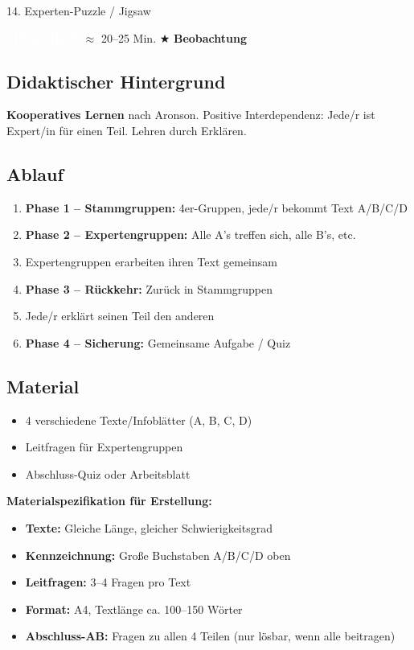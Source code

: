 \documentclass[11pt, a4paper]{article}
\newcommand{\tagSprechen}{\colorbox{sprechen}{\textcolor{white}{\footnotesize\textbf{SPRECHEN}}}}
\newcommand{\zeit}[1]{\textcolor{grau}{\footnotesize $\approx$ #1 Min.}}
\newcommand{\beobachtung}{\textcolor{erfolg}{\footnotesize $\bigstar$ \textbf{Beobachtung}}}
\begin{document}
\begin{methode}{14. Experten-Puzzle / Jigsaw}

\tagSprechen{} \zeit{20--25} \hfill \beobachtung

\subsection*{Didaktischer Hintergrund}
\textbf{Kooperatives Lernen} nach Aronson. Positive Interdependenz: Jede/r ist Expert/in für einen Teil. Lehren durch Erklären.

\subsection*{Ablauf}
\begin{enumerate}[leftmargin=*]
    \item \textbf{Phase 1 -- Stammgruppen:} 4er-Gruppen, jede/r bekommt Text A/B/C/D
    \item \textbf{Phase 2 -- Expertengruppen:} Alle A's treffen sich, alle B's, etc.
    \item Expertengruppen erarbeiten ihren Text gemeinsam
    \item \textbf{Phase 3 -- Rückkehr:} Zurück in Stammgruppen
    \item Jede/r erklärt seinen Teil den anderen
    \item \textbf{Phase 4 -- Sicherung:} Gemeinsame Aufgabe / Quiz
\end{enumerate}

\subsection*{Material}
\begin{materialbox}
\begin{itemize}[label=$\square$, leftmargin=*]
    \item 4 verschiedene Texte/Infoblätter (A, B, C, D)
    \item Leitfragen für Expertengruppen
    \item Abschluss-Quiz oder Arbeitsblatt
\end{itemize}

\textbf{Materialspezifikation für Erstellung:}
\begin{itemize}[leftmargin=*]
    \item \textbf{Texte:} Gleiche Länge, gleicher Schwierigkeitsgrad
    \item \textbf{Kennzeichnung:} Große Buchstaben A/B/C/D oben
    \item \textbf{Leitfragen:} 3--4 Fragen pro Text
    \item \textbf{Format:} A4, Textlänge ca. 100--150 Wörter
    \item \textbf{Abschluss-AB:} Fragen zu allen 4 Teilen (nur lösbar, wenn alle beitragen)
\end{itemize}
\end{materialbox}


\end{methode}
\end{document}

